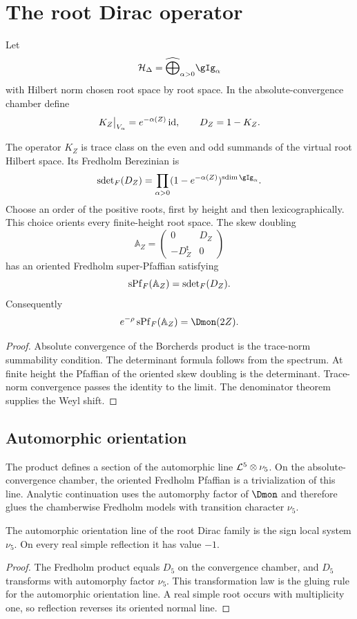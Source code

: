 \chapter{The root Dirac operator}
Let
\[
 \Hcal_\Delta=
 \widehat\bigoplus_{\alpha>0}\gIg_\alpha
\]
with Hilbert norm chosen root space by root space.  In the absolute-convergence chamber define
\[
 K_Z\big|_{V_\alpha}=e^{-\alpha(Z)}\operatorname{id},
 \qquad
 D_Z=1-K_Z.
\]

\begin{theorem}
The operator $K_Z$ is trace class on the even and odd summands of the virtual root Hilbert space.  Its Fredholm Berezinian is
\[
 \sdet_F(D_Z)
 =\prod_{\alpha>0}(1-e^{-\alpha(Z)})^{\sdim\gIg_\alpha}.
\]
Choose an order of the positive roots, first by height and then lexicographically.  This choice orients every finite-height root space.  The skew doubling
\[
 \mathbb A_Z=
 \begin{pmatrix}0&D_Z\\-D_Z^{\mathsf t}&0\end{pmatrix}
\]
has an oriented Fredholm super-Pfaffian satisfying
\[
 \operatorname{sPf}_F(\mathbb A_Z)=\operatorname{sdet}_F(D_Z).
\]
Consequently
\[
 e^{-\rho}\operatorname{sPf}_F(\mathbb A_Z)=\Dmon(2Z).
\]
\end{theorem}
\begin{proof}
Absolute convergence of the Borcherds product is the trace-norm summability condition.  The determinant formula follows from the spectrum.  At finite height the Pfaffian of the oriented skew doubling is the determinant.  Trace-norm convergence passes the identity to the limit.  The denominator theorem supplies the Weyl shift.
\end{proof}

\section{Automorphic orientation}
The product defines a section of the automorphic line $\mathcal L^5\otimes\nu_5$.  On the absolute-convergence chamber, the oriented Fredholm Pfaffian is a trivialization of this line.  Analytic continuation uses the automorphy factor of $\Dmon$ and therefore glues the chamberwise Fredholm models with transition character $\nu_5$.

\begin{corollary}
The automorphic orientation line of the root Dirac family is the sign local system $\nu_5$.  On every real simple reflection it has value $-1$.
\end{corollary}
\begin{proof}
The Fredholm product equals $D_5$ on the convergence chamber, and $D_5$ transforms with automorphy factor $\nu_5$.  This transformation law is the gluing rule for the automorphic orientation line.  A real simple root occurs with multiplicity one, so reflection reverses its oriented normal line.
\end{proof}

